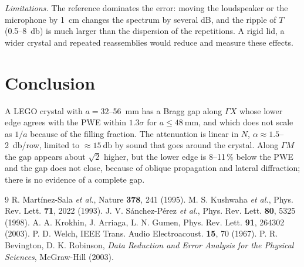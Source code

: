 \documentclass[9pt,a4paper,twocolumn]{extarticle}
\newcommand{\pbreak}{\par\vspace{3pt}}
\newcommand{\umm}{\milli\metre}
\newcommand{\ucm}{\centi\metre}
\newcommand{\udB}{\decibel}
\newcommand{\GX}{\ensuremath{\Gamma X}}
\newcommand{\GM}{\ensuremath{\Gamma M}}
\begin{document}
\emph{Limitations.} The reference dominates the error: moving the loudspeaker or the microphone by \SI{1}{\ucm} changes the spectrum by several dB, and the ripple of $T$ (0.5--\SI{8}{\udB}) is much larger than the dispersion of the repetitions. A rigid lid, a wider crystal and repeated reassemblies would reduce and measure these effects.

\section{Conclusion}
A LEGO crystal with $a=32$--\SI{56}{\umm} has a Bragg gap along \GX{} whose lower edge agrees with the PWE within $1.3\sigma$ for $a\le\SI{48}{\umm}$, and which does not scale as $1/a$ because of the filling fraction. The attenuation is linear in $N$, $\alpha\approx1.5$--\SI{2}{\udB}/row, limited to $\approx\SI{15}{\udB}$ by sound that goes around the crystal. Along \GM{} the gap appears about $\sqrt2$ higher, but the lower edge is 8--11\,\% below the PWE and the gap does not close, because of oblique propagation and lateral diffraction; there is no evidence of a complete gap.

\begin{thebibliography}{9}\footnotesize
\setlength{\itemsep}{1pt}
 R. Martínez-Sala \emph{et al.}, Nature \textbf{378}, 241 (1995).
 M. S. Kushwaha \emph{et al.}, Phys. Rev. Lett. \textbf{71}, 2022 (1993).
 J. V. Sánchez-Pérez \emph{et al.}, Phys. Rev. Lett. \textbf{80}, 5325 (1998).
 A. A. Krokhin, J. Arriaga, L. N. Gumen, Phys. Rev. Lett. \textbf{91}, 264302 (2003).
 P. D. Welch, IEEE Trans. Audio Electroacoust. \textbf{15}, 70 (1967).
 P. R. Bevington, D. K. Robinson, \emph{Data Reduction and Error Analysis for the Physical Sciences}, McGraw-Hill (2003).
\end{thebibliography}

\pbreak
\onecolumn
\appendix
\end{document}
